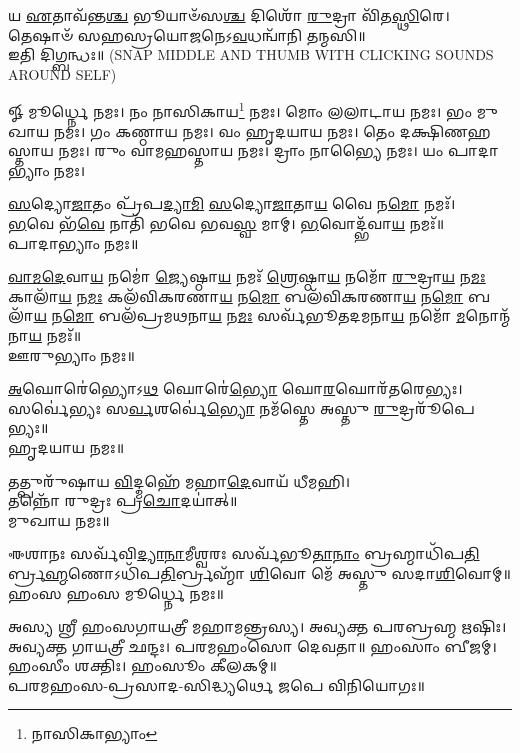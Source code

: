𑌯 \ul{𑌏}\-𑌤𑌾𑌵᳴𑌨𑍍𑌤\-\ul{𑌶𑍍𑌚} 𑌭𑍂𑌯𑌾𑍞᳴𑌸\-\ul{𑌶𑍍𑌚} 𑌦𑌿𑌶𑍋᳴ \ul{𑌰𑍁}\-𑌦𑍍𑌰𑌾 𑌵𑌿᳴𑌤\-\ul{𑌸𑍍𑌥𑌿}\-𑌰𑍇।\\
 𑌤𑍇𑌷𑌾𑍞᳴ 𑌸𑌹𑌸𑍍𑌰𑌯𑍋\-\ul{𑌜}\-𑌨𑍇𑌽\-\ul{𑌵}\-𑌧𑌨𑍍𑌵𑌾᳴𑌨𑌿 𑌤𑌨𑍍𑌮𑌸𑌿॥ \\
𑌇𑌤𑌿 𑌦𑌿𑌗𑍍𑌬𑌨𑍍𑌧𑌃॥ {\scriptsize (SNAP MIDDLE AND THUMB WITH CLICKING SOUNDS AROUND SELF)}

{\small \closesection}

𑍐 𑌮𑍂𑌰𑍍𑌧𑍍𑌨𑍇 𑌨𑌮𑌃। 𑌨𑌂 𑌨𑌾𑌸𑌿𑌕𑌾𑌯\footnote{𑌨𑌾𑌸𑌿𑌕𑌾𑌭𑍍𑌯𑌾𑌂} 𑌨𑌮𑌃। 𑌮𑍋𑌂 𑌲𑌲𑌾𑌟𑌾𑌯 𑌨𑌮𑌃। 𑌭𑌂 𑌮𑍁𑌖𑌾𑌯 𑌨𑌮𑌃। 𑌗𑌂 𑌕𑌣𑍍𑌠𑌾𑌯 𑌨𑌮𑌃। 𑌵𑌂 𑌹𑍃𑌦𑌯𑌾𑌯 𑌨𑌮𑌃। 𑌤𑍇𑌂 𑌦𑌕𑍍𑌷𑌿𑌣𑌹𑌸𑍍𑌤𑌾𑌯 𑌨𑌮𑌃। 𑌰𑍁𑌂 𑌵𑌾𑌮𑌹𑌸𑍍𑌤𑌾𑌯 𑌨𑌮𑌃। 𑌦𑍍𑌰𑌾𑌂 𑌨𑌾𑌭𑍍𑌯𑍈 𑌨𑌮𑌃। 𑌯𑌂 𑌪𑌾𑌦𑌾𑌭𑍍𑌯𑌾𑌂 𑌨𑌮𑌃।

\-\ul{𑌸}\-𑌦𑍍𑌯𑍋\-\ul{𑌜𑌾}\-𑌤𑌂 𑌪𑍍𑌰᳴𑌪\-\ul{𑌦𑍍𑌯𑌾}\-\-\ul{𑌮𑌿} \ul{𑌸}\-𑌦𑍍𑌯𑍋\-\ul{𑌜𑌾}\-𑌤𑌾\-\ul{𑌯} 𑌵𑍈 𑌨\-\ul{𑌮𑍋} 𑌨𑌮𑌃᳴।\\
\-\ul{𑌭}\-𑌵𑍇 𑌭᳴\-\ul{𑌵𑍇} 𑌨𑌾𑌤𑌿᳴ 𑌭𑌵𑍇 𑌭𑌵\-\ul{𑌸𑍍𑌵} 𑌮𑌾𑌮𑍍। \ul{𑌭}\-𑌵𑍋𑌦𑍍𑌭᳴𑌵𑌾\-\ul{𑌯} 𑌨𑌮𑌃᳴॥ \\
𑌪𑌾𑌦𑌾𑌭𑍍𑌯𑌾𑌂 𑌨𑌮𑌃॥

\-\ul{𑌵𑌾}\-\-\ul{𑌮}\-\-\ul{𑌦𑍇}\-𑌵𑌾\-\ul{𑌯} 𑌨𑌮𑍋॑ \ul{𑌜𑍍𑌯𑍇}\-𑌷𑍍𑌠𑌾\-\ul{𑌯} 𑌨𑌮𑌃᳴ \ul{𑌶𑍍𑌰𑍇}\-𑌷𑍍𑌠𑌾\-\ul{𑌯} 𑌨𑌮𑍋᳴ \ul{𑌰𑍁}\-𑌦𑍍𑌰𑌾\-\ul{𑌯} 𑌨\-\ul{𑌮𑌃} 𑌕𑌾𑌲𑌾᳴\-\ul{𑌯} 𑌨\-\ul{𑌮𑌃} 𑌕𑌲᳴𑌵𑌿𑌕𑌰𑌣𑌾\-\ul{𑌯} 𑌨\-\ul{𑌮𑍋} 𑌬𑌲᳴𑌵𑌿𑌕𑌰𑌣𑌾\-\ul{𑌯} 𑌨\-\ul{𑌮𑍋} 𑌬𑌲𑌾᳴\-\ul{𑌯} 𑌨\-\ul{𑌮𑍋} 𑌬𑌲᳴𑌪𑍍𑌰𑌮𑌥𑌨𑌾\-\ul{𑌯} 𑌨\-\ul{𑌮𑌃} 𑌸𑌰𑍍𑌵᳴𑌭𑍂𑌤𑌦𑌮𑌨𑌾\-\ul{𑌯} 𑌨𑌮𑍋᳴ \ul{𑌮}\-𑌨𑍋𑌨𑍍𑌮᳴𑌨𑌾\-\ul{𑌯} 𑌨𑌮𑌃᳴॥\\
𑌊𑌰𑍁𑌭𑍍𑌯𑌾𑌂 𑌨𑌮𑌃॥ 

\-\ul{𑌅}\-𑌘𑍋𑌰𑍇॑𑌭𑍍𑌯𑍋𑌽\-\ul{𑌥} 𑌘𑍋𑌰𑍇॑\-\ul{𑌭𑍍𑌯𑍋} 𑌘𑍋\-\ul{𑌰}\-𑌘𑍋𑌰᳴𑌤𑌰𑍇𑌭𑍍𑌯𑌃।\\
𑌸𑌰𑍍𑌵𑍇॑𑌭𑍍𑌯𑌃 𑌸\-\ul{𑌰𑍍𑌵}\-𑌶𑌰𑍍𑌵𑍇॑\-\ul{𑌭𑍍𑌯𑍋} 𑌨𑌮᳴𑌸𑍍𑌤𑍇 𑌅𑌸𑍍𑌤𑍁 \ul{𑌰𑍁}\-𑌦𑍍𑌰𑌰𑍂᳴𑌪𑍇𑌭𑍍𑌯𑌃॥\\
𑌹𑍃𑌦𑌯𑌾𑌯 𑌨𑌮𑌃॥ 

𑌤𑌤𑍍𑌪𑍁𑌰𑍁᳴𑌷𑌾𑌯 \ul{𑌵𑌿}\-𑌦𑍍𑌮𑌹𑍇᳴ 𑌮𑌹𑌾\-\ul{𑌦𑍇}\-𑌵𑌾𑌯᳴ 𑌧𑍀𑌮𑌹𑌿।\\
𑌤𑌨𑍍𑌨𑍋᳴ 𑌰𑍁𑌦𑍍𑌰𑌃 𑌪𑍍𑌰\-\ul{𑌚𑍋}\-𑌦𑌯𑌾॑𑌤𑍍॥\\
𑌮𑍁𑌖𑌾𑌯 𑌨𑌮𑌃॥ 

𑌈𑌶𑌾𑌨𑌃 𑌸𑌰𑍍𑌵᳴𑌵𑌿\-\ul{𑌦𑍍𑌯𑌾}\-\-\ul{𑌨𑌾}\-𑌮𑍀𑌶𑍍𑌵𑌰𑌃 𑌸𑌰𑍍𑌵᳴𑌭𑍂\-\ul{𑌤𑌾}\-\-\ul{𑌨𑌾𑌂} 𑌬𑍍𑌰𑌹𑍍𑌮𑌾𑌧𑌿᳴𑌪\-\ul{𑌤𑌿}\-𑌰𑍍𑌬𑍍𑌰\-\ul{𑌹𑍍𑌮}\-𑌣𑍋\-𑌽𑌧𑌿᳴𑌪\-\ul{𑌤𑌿}\-𑌰𑍍𑌬𑍍𑌰𑌹𑍍𑌮𑌾᳴ \ul{𑌶𑌿}\-𑌵𑍋 𑌮𑍇᳴ 𑌅𑌸𑍍𑌤𑍁 𑌸𑌦𑌾\-\ul{𑌶𑌿}\-𑌵𑍋𑌮𑍍॥\\
𑌹𑌂𑌸 𑌹𑌂𑌸 𑌮𑍂𑌰𑍍𑌧𑍍𑌨𑍇 𑌨𑌮𑌃॥ \\
{\small \closesection}

𑌅𑌸𑍍𑌯 𑌶𑍍𑌰𑍀 𑌹𑌂𑌸𑌗𑌾𑌯𑌤𑍍𑌰𑍀 𑌮𑌹𑌾𑌮𑌨𑍍𑌤𑍍𑌰𑌸𑍍𑌯। 𑌅𑌵𑍍𑌯𑌕𑍍𑌤 𑌪𑌰𑌬𑍍𑌰𑌹𑍍𑌮 𑌋𑌷𑌿𑌃। 𑌅𑌵𑍍𑌯𑌕𑍍𑌤 𑌗𑌾𑌯𑌤𑍍𑌰𑍀 𑌛𑌨𑍍𑌦𑌃। 𑌪𑌰𑌮𑌹𑌂𑌸𑍋 𑌦𑍇𑌵𑌤𑌾॥ 𑌹𑌂𑌸𑌾𑌂 𑌬𑍀𑌜𑌮𑍍। 𑌹𑌂𑌸𑍀𑌂 𑌶𑌕𑍍𑌤𑌿𑌃। 𑌹𑌂𑌸𑍂𑌂 𑌕𑍀𑌲𑌕𑌮𑍍॥\\
𑌪𑌰𑌮𑌹𑌂𑌸-𑌪𑍍𑌰𑌸𑌾𑌦-𑌸𑌿𑌦𑍍𑌧𑍍𑌯𑌰𑍍𑌥𑍇 𑌜𑌪𑍇 𑌵𑌿𑌨𑌿𑌯𑍋𑌗𑌃॥

